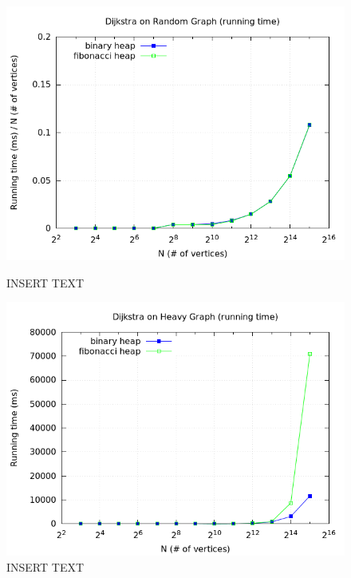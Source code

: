 \documentclass[a4paper,oneside,article,11pt]{memoir}
\begin{document}
\begin{figure}[H]
\centering
\begin{minipage}{0.48\columnwidth}
  \centering
  \includegraphics[width=\linewidth]{../res/dijkstra/d_random_rt_div_n.png}%
  \caption{INSERT TEXT}
  \label{fig:delmin_2_random_branch}
\end{minipage}%
\hfill
\begin{minipage}{0.48\columnwidth}
  \centering
  \includegraphics[width=\linewidth]{../res/dijkstra/d_heavy_rt_div_n.png}%
  \caption{INSERT TEXT}
  \label{fig:delmin_2_worst_branch}
\end{minipage}
\end{figure}
\end{document}
